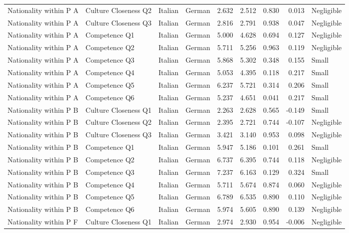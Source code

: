 \begin{table}
\begin{tabular}{llllrrrrl}
Nationality  within  P  A & Culture  Closeness  Q2 & Italian & German & 2.632 & 2.512 & 0.830 & 0.013 & Negligible \\
Nationality  within  P  A & Culture  Closeness  Q3 & Italian & German & 2.816 & 2.791 & 0.938 & 0.047 & Negligible \\
Nationality  within  P  A & Competence  Q1 & Italian & German & 5.000 & 4.628 & 0.694 & 0.127 & Negligible \\
Nationality  within  P  A & Competence  Q2 & Italian & German & 5.711 & 5.256 & 0.963 & 0.119 & Negligible \\
Nationality  within  P  A & Competence  Q3 & Italian & German & 5.868 & 5.302 & 0.348 & 0.155 & Small \\
Nationality  within  P  A & Competence  Q4 & Italian & German & 5.053 & 4.395 & 0.118 & 0.217 & Small \\
Nationality  within  P  A & Competence  Q5 & Italian & German & 6.237 & 5.721 & 0.314 & 0.206 & Small \\
Nationality  within  P  A & Competence  Q6 & Italian & German & 5.237 & 4.651 & 0.041 & 0.217 & Small \\
Nationality  within  P  B & Culture  Closeness  Q1 & Italian & German & 2.263 & 2.628 & 0.565 & -0.149 & Small \\
Nationality  within  P  B & Culture  Closeness  Q2 & Italian & German & 2.395 & 2.721 & 0.744 & -0.107 & Negligible \\
Nationality  within  P  B & Culture  Closeness  Q3 & Italian & German & 3.421 & 3.140 & 0.953 & 0.098 & Negligible \\
Nationality  within  P  B & Competence  Q1 & Italian & German & 5.947 & 5.186 & 0.101 & 0.261 & Small \\
Nationality  within  P  B & Competence  Q2 & Italian & German & 6.737 & 6.395 & 0.744 & 0.118 & Negligible \\
Nationality  within  P  B & Competence  Q3 & Italian & German & 7.237 & 6.163 & 0.129 & 0.324 & Small \\
Nationality  within  P  B & Competence  Q4 & Italian & German & 5.711 & 5.674 & 0.874 & 0.060 & Negligible \\
Nationality  within  P  B & Competence  Q5 & Italian & German & 6.789 & 6.535 & 0.890 & 0.110 & Negligible \\
Nationality  within  P  B & Competence  Q6 & Italian & German & 5.974 & 5.605 & 0.890 & 0.139 & Negligible \\
Nationality  within  P  F & Culture  Closeness  Q1 & Italian & German & 2.974 & 2.930 & 0.954 & -0.006 & Negligible \\

\end{tabular}
\end{table}
